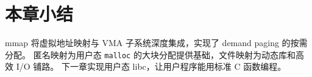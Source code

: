 \section{本章小结}

mmap 将虚拟地址映射与 VMA 子系统深度集成，实现了 demand paging 的按需分配。
匿名映射为用户态 \texttt{malloc} 的大块分配提供基础，文件映射为动态库和高效 I/O 铺路。
下一章实现用户态 libc，让用户程序能用标准 C 函数编程。
